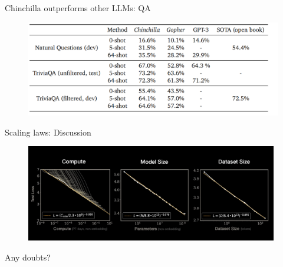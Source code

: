 
\begin{vbframe}{Chinchilla outperforms other LLM\MakeLowercase{s}: QA}

\vfill

\begin{figure}
	\centering
	\includegraphics[width = 12cm]{./figure/chinchilla_qa.png} \\ 
\end{figure}

\vfill

\end{vbframe}


\begin{vbframe}{Scaling laws: Discussion}

\vfill

\begin{figure}
	\centering
	\includegraphics[width = 11cm]{./figure/3thingserrorratescaleswith.png} \\ 
\end{figure}

\ques Any doubts?

\vfill


\end{vbframe}

